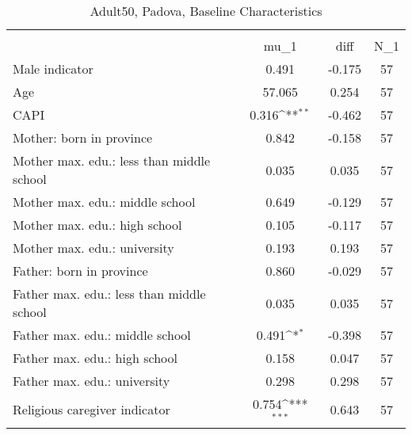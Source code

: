 \begin{table}[htbp]\centering
\def\sym#1{\ifmmode^{#1}\else\(^{#1}\)\fi}
\caption{Adult50, Padova, Baseline Characteristics}
\begin{tabular}{l*{1}{ccc}}
\toprule
                    &\multicolumn{3}{c}{}                           \\
                    &        mu\_1         &        diff&         N\_1\\
\midrule
Male indicator      &       0.491         &      -0.175&          57\\
Age                 &      57.065         &       0.254&          57\\
CAPI                &       0.316\sym{**} &      -0.462&          57\\
Mother: born in province&       0.842         &      -0.158&          57\\
Mother max. edu.: less than middle school&       0.035         &       0.035&          57\\
Mother max. edu.: middle school&       0.649         &      -0.129&          57\\
Mother max. edu.: high school&       0.105         &      -0.117&          57\\
Mother max. edu.: university&       0.193         &       0.193&          57\\
Father: born in province&       0.860         &      -0.029&          57\\
Father max. edu.: less than middle school&       0.035         &       0.035&          57\\
Father max. edu.: middle school&       0.491\sym{*}  &      -0.398&          57\\
Father max. edu.: high school&       0.158         &       0.047&          57\\
Father max. edu.: university&       0.298         &       0.298&          57\\
Religious caregiver indicator&       0.754\sym{***}&       0.643&          57\\
\bottomrule
\end{tabular}
\end{table}
